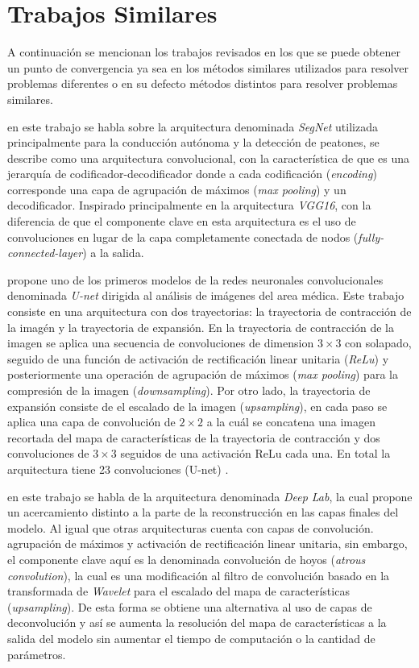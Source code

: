 \section{Trabajos Similares}

A continuación se mencionan los trabajos revisados en los que se puede obtener un punto de convergencia ya sea en los métodos similares utilizados para resolver problemas diferentes o en su defecto métodos distintos para resolver problemas similares.

\citet{DBLP:journals/corr/BadrinarayananK15} en este trabajo se habla sobre la arquitectura denominada \emph{SegNet} utilizada principalmente para la conducción autónoma y la detección de peatones, se describe como una arquitectura convolucional, con la característica de que es una jerarquía de codificador-decodificador donde a cada codificación (\emph{encoding}) corresponde una capa de agrupación de máximos (\emph{max pooling}) y un decodificador. Inspirado principalmente en la arquitectura \emph{VGG16}, con la diferencia de que el componente clave en esta arquitectura es el uso de convoluciones en lugar de la capa completamente conectada de nodos (\emph{fully-connected-layer}) a la salida.

\citet{DBLP:journals/corr/RonnebergerFB15} propone uno de los primeros modelos de la redes neuronales convolucionales denominada \emph{U-net} dirigida al análisis de imágenes del area médica. Este trabajo consiste en una arquitectura con dos trayectorias: la trayectoria de contracción de la imagén y la trayectoria de expansión. En la trayectoria de contracción de la imagen se aplica una secuencia de convoluciones de dimension $3 \times 3$ con solapado, seguido de una función de activación de rectificación linear unitaria (\emph{ReLu}) y posteriormente una operación de agrupación de máximos (\emph{max pooling}) para la compresión de la imagen (\emph{downsampling}). Por otro lado, la trayectoria de expansión consiste de el escalado de la imagen (\emph{upsampling}), en cada paso se aplica una capa de convolución de $2 \times 2$ a la cuál se concatena una imagen recortada del mapa de características de la trayectoria de contracción y dos convoluciones de $3 \times 3$ seguidos de una activación ReLu cada una. En total la arquitectura tiene 23 convoluciones (U-net) .

\citet{DBLP:journals/corr/ChenPK0Y16} en este trabajo se habla de la arquitectura denominada \emph{Deep Lab}, la cual propone un acercamiento distinto a la parte de la reconstrucción en las capas finales del modelo. Al igual que otras arquitecturas cuenta con capas de convolución. agrupación de máximos y activación de rectificación linear unitaria, sin embargo, el componente clave aquí es la denominada convolución de hoyos (\emph{atrous convolution}), la cual es una modificación al filtro de convolución basado en la transformada de \emph{Wavelet} para el escalado del mapa de características (\emph{upsampling}). De esta forma se obtiene una alternativa al uso de capas de deconvolución y así se aumenta la resolución del mapa de características a la salida del modelo sin aumentar el tiempo de computación o la cantidad de parámetros.

